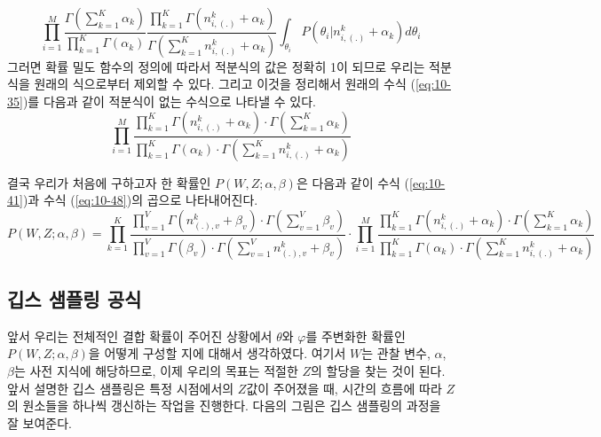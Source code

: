 \documentclass[a4paper]{oblivoir}
\begin{document}
\begin{equation}
\prod_{i=1}^{M} \frac{\Gamma(\sum_{k=1}^{K} \alpha_{k})}{\prod_{k=1}^{K} \Gamma(\alpha_{k})} \frac{\prod_{k=1}^{K} \Gamma(n^{k}_{i,(.)}+\alpha_{k})}{\Gamma(\sum_{k=1}^{K} n^{k}_{i,(.)}+\alpha_{k})} \int_{\theta_{i}} P(\theta_{i}|n^{k}_{i,(.)}+\alpha_{k})  d\theta_{i} 
\label{eq:10-47}
\end{equation}
그러면 확률 밀도 함수의 정의에 따라서 적분식의 값은 정확히 1이 되므로 우리는 적분식을 원래의 식으로부터 제외할 수 있다. 그리고 이것을 정리해서 원래의 수식 (\ref{eq:10-35})를 다음과 같이 적분식이 없는 수식으로 나타낼 수 있다.  
\begin{equation}
\prod_{i=1}^{M} \frac{\prod_{k=1}^{K} \Gamma(n^{k}_{i,(.)}+\alpha_{k}) \cdot \Gamma(\sum_{k=1}^{K} \alpha_{k})}{\prod_{k=1}^{K} \Gamma(\alpha_{k}) \cdot \Gamma(\sum_{k=1}^{K} n^{k}_{i,(.)}+\alpha_{k})}
\label{eq:10-48}
\end{equation}

결국 우리가 처음에 구하고자 한 확률인 $P(W,Z ; \alpha,\beta)$은 다음과 같이 수식 (\ref{eq:10-41})과 수식 (\ref{eq:10-48})의 곱으로 나타내어진다. \\
\begin{equation}
P(W,Z ; \alpha,\beta) = \prod_{k=1}^{K} \frac{\prod_{v=1}^{V} \Gamma(n_{(.),v}^{k}+\beta_{v}) \cdot \Gamma(\sum_{v=1}^{V} \beta_{v})}{\prod_{v=1}^{V} \Gamma(\beta_{v}) \cdot \Gamma(\sum_{v=1}^{V} n_{(.),v}^{k}+\beta_{v})} \cdot \prod_{i=1}^{M} \frac{\prod_{k=1}^{K} \Gamma(n^{k}_{i,(.)}+\alpha_{k}) \cdot \Gamma(\sum_{k=1}^{K} \alpha_{k})}{\prod_{k=1}^{K} \Gamma(\alpha_{k}) \cdot \Gamma(\sum_{k=1}^{K} n^{k}_{i,(.)}+\alpha_{k})}
\label{eq:10-49}
\end{equation}

\subsection{깁스 샘플링 공식}
앞서 우리는 전체적인 결합 확률이 주어진 상황에서 $\theta$와 $\varphi$를 주변화한 확률인 $P(W,Z ; \alpha,\beta)$을 어떻게 구성할 지에 대해서 생각하였다. 여기서 $W$는 관찰 변수, $\alpha$, $\beta$는 사전 지식에 해당하므로, 이제 우리의 목표는 적절한 $Z$의 할당을 찾는 것이 된다. 앞서 설명한 깁스 샘플링은 특정 시점에서의 $Z$값이 주어졌을 때, 시간의 흐름에 따라 $Z$의 원소들을 하나씩 갱신하는 작업을 진행한다. 다음의 그림은 깁스 샘플링의 과정을 잘 보여준다. \\
    
\end{document}
